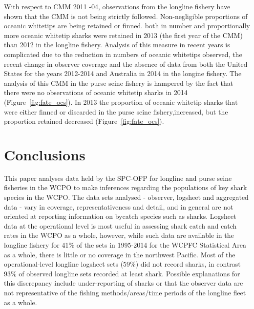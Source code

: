 \documentclass[12pt]{SCreport}
\begin{document}
With respect to CMM 2011 -04, observations from  the  longline  fishery have shown that the CMM is not being strictly followed. 
Non-negligible proportions of oceanic whitetips are being retained or finned. both in number and proportionally more oceanic whitetip sharks were retained in 2013 (the first year of the CMM) than 2012 in the longline fishery.   Analysis of this measure in recent years is complicated due to the reduction in numbers of oceanic whitetips observed, the recent change in observer coverage and  the absence of data from both the United States for the years 2012-2014  and Australia in 2014 in the longine fishery.   The analysis of this CMM in the purse seine fishery is hampered by the fact that there were no observations of oceanic whitetip sharks in 2014 (Figure~\ref{fig:fate_ocs}).    In 2013 the proportion of oceanic whitetip sharks that were either finned or discarded in the purse seine fishery,increased, but the proportion retained decreased (Figure~\ref{fig:fate_ocs}).    

 

\section{Conclusions }

This paper analyses data held by the SPC-OFP for longline and purse seine fisheries in the WCPO to make inferences regarding the populations of key shark species in the WCPO. The data sets analysed - observer, logsheet and aggregated data - vary in coverage, representativeness and detail, and in general are not oriented at reporting information on bycatch species such as sharks. Logsheet data at the operational level is most useful in assessing shark catch and catch rates in the WCPO as a whole, however, while such data are available in the longline fishery for 41\% of the sets in 1995-2014 for the WCPFC Statistical Area as a whole, there is little or no coverage in the northwest Pacific. Most of the operational-level longline logsheet sets (59\%) did not record sharks, in contrast 93\% of observed longline sets recorded at least shark.  Possible explanations for this discrepancy include under-reporting of sharks or that the observer data are not representative of the fishing methods/areas/time periods of the longline fleet as a whole.
\end{document}
